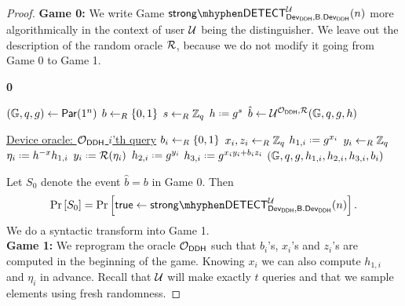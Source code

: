 \begin{proof}
\noindent\textbf{Game 0:} We write Game $\strongdetect{\dev_{\DDH}}{\bbdev_{\DDH}}{\user}$ more algorithmically in the context of user $\mathcal{U}$ being the distinguisher. We leave out the description of the random oracle $\operatorname{\mathcal{R}}$, because we do not modify it going from Game 0 to Game 1. 

\vspace*{-.3cm}
\begin{Algorithm}[]{6cm}
\captionGame
\caption{\textbf{0}}
\begin{algorithmic}[1]
\State $(\mathbb{G},q,g)\leftarrow\operatorname{\mathsf{Par}}(1^n)$
\State $b\leftarrow_R\left\{0,1\right\}$
\State $s\leftarrow_R\mathbb{Z}_q$
\State $h \defeq g^s$
\State $\hat{b}\leftarrow\mathcal{U}^{\operatorname{\mathcal{O}}_{\mathsf{DDH}},\operatorname{\mathcal{R}}}(\mathbb{G},q,g,h)$
\Statex\hrulefill
\end{algorithmic}
\begin{algorithmic}[1]
\Statex \underline{Device oracle: \textbf{$\operatorname{\mathcal{O}}_{\mathsf{DDH}}$} $i$'th query}
\Statex
\State $b_i\leftarrow_R\left\{0,1\right\}$
\State $x_i,z_i\leftarrow_R\mathbb{Z}_q$
\State $h_{1,i} \defeq g^{x_i}$
\State $y_i\leftarrow_R\mathbb{Z}_q$
\Else
\State $\eta_i \defeq h^{-x}h_{1,i}$
\State $y_i \defeq \RO(\eta_i)$
\EndIf
\State $h_{2,i} \defeq g^{y_i}$
\State $h_{3,i} \defeq g^{x_iy_i+b_iz_i}$
\State \Ret $(\mathbb{G},q,g,h_{1,i},h_{2,i},h_{3,i},b_i)$
\end{algorithmic}
\end{Algorithm}
\begin{comment}
\begin{algorithmic}[1]
\Statex \underline{Random oracle: \textbf{$\RO(\lambda)$}}
\Statex
\State If $(\lambda,y)$ is in $Q_{\RO}$ for some $y$ \Ret $y$
\State $y\unileft \Zq$
\State Store $(\lambda,y)$ in $Q_{\RO}$
\State \Ret $y$
\end{algorithmic}
\end{comment}

Let $S_0$ denote the event $\hat{b} = b$ in Game 0. Then 
\begin{align*}
	\prob{S_0} = \prob{\true\leftarrow\strongdetect{\dev_{\DDH}}{\bbdev_{\DDH}}{\user}}.
\end{align*}
We do a syntactic transform into Game 1. \\

\noindent\textbf{Game 1:} We reprogram the oracle $\operatorname{\mathcal{O}}_{\mathsf{DDH}}$ such that $b_i$'s, $x_i$'s and $z_i$'s are computed in the beginning of the game. Knowing $x_i$ we can also compute $h_{1,i}$ and $\eta_i$ in advance. Recall that $\mathcal{U}$ will make exactly $t$ queries and that we sample elements using fresh randomness.


\end{proof}
